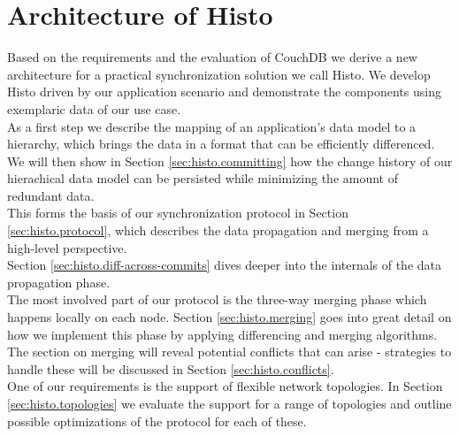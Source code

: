 
\chapter{Architecture of Histo}
\label{sec:histo}

Based on the requirements and the evaluation of CouchDB we derive a new architecture for a practical synchronization solution we call Histo.
We develop Histo driven by our application scenario and demonstrate the components using exemplaric data of our use case.\\
As a first step we describe the mapping of an application's data model to a hierarchy, which brings the data in a format that can be efficiently differenced.\\
We will then show in Section \ref{sec:histo.committing} how the change history of our hierachical data model can be persisted while minimizing the amount of redundant data.\\
This forms the basis of our synchronization protocol in Section \ref{sec:histo.protocol}, which describes the data propagation and merging from a high-level perspective.\\
Section \ref{sec:histo.diff-across-commits} dives deeper into the internals of the data propagation phase.\\
The most involved part of our protocol is the three-way merging phase which happens locally on each node.
Section \ref{sec:histo.merging} goes into great detail on how we implement this phase by applying differencing and merging algorithms.\\
The section on merging will reveal potential conflicts that can arise - strategies to handle these will be discussed in Section \ref{sec:histo.conflicts}.\\
One of our requirements is the support of flexible network topologies.
In Section \ref{sec:histo.topologies} we evaluate the support for a range of topologies and outline possible optimizations of the protocol for each of these.















